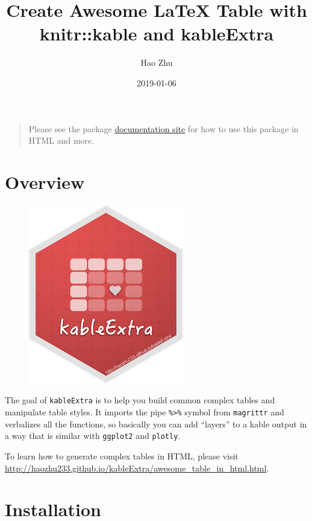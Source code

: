 \documentclass[table]{article}
\title{Create Awesome LaTeX Table with knitr::kable and kableExtra}
\author{Hao Zhu}
\date{2019-01-06}
\begin{document}
\maketitle

{
\setcounter{tocdepth}{2}
\tableofcontents
}
\clearpage

\begin{quote}
Please see the package
\href{http://haozhu233.github.io/kableExtra}{documentation site} for how
to use this package in HTML and more.
\end{quote}

\hypertarget{overview}{%
\section{Overview}\label{overview}}

\begin{figure}\centering
  \includegraphics{kableExtra_sm.png}
\end{figure}

The goal of \texttt{kableExtra} is to help you build common complex
tables and manipulate table styles. It imports the pipe
\texttt{\%\textgreater{}\%} symbol from \texttt{magrittr} and verbalizes
all the functions, so basically you can add ``layers'' to a kable output
in a way that is similar with \texttt{ggplot2} and \texttt{plotly}.

To learn how to generate complex tables in HTML, please visit
\url{http://haozhu233.github.io/kableExtra/awesome_table_in_html.html}.

\hypertarget{installation}{%
\section{Installation}\label{installation}}
\end{document}
